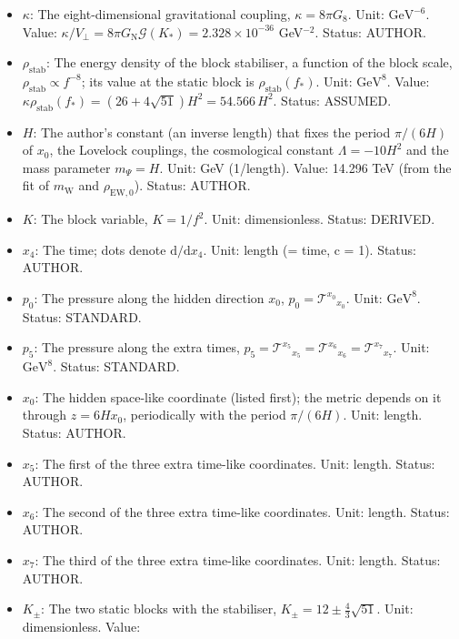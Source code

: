 \documentclass[
  10pt,
]{article}
\providecommand{\tightlist}{%
  \setlength{\itemsep}{0pt}\setlength{\parskip}{0pt}}
\begin{document}
\begin{itemize}
\tightlist
\item
  \(\kappa\): The eight-dimensional gravitational coupling,
  \(\kappa = 8\pi G_8\). Unit: \(\mathrm{GeV}^{-6}\). Value:
  \(\kappa/V_\perp = 8\pi G_{\mathrm{N}}\mathcal{G}(K_*) = 2.328\times10^{-36}\)
  GeV\(^{-2}\). Status: AUTHOR.
\item
  \(\rho_{\mathrm{stab}}\): The energy density of the block stabiliser,
  a function of the block scale,
  \(\rho_{\mathrm{stab}} \propto f^{-8}\); its value at the static block
  is \(\rho_{\mathrm{stab}}(f_*)\). Unit: \(\mathrm{GeV}^{8}\). Value:
  \(\kappa\rho_{\mathrm{stab}}(f_*) = (26 + 4\sqrt{51})H^2 = 54.566\,H^2\).
  Status: ASSUMED.
\item
  \(H\): The author's constant (an inverse length) that fixes the period
  \(\pi/(6H)\) of \(x_0\), the Lovelock couplings, the cosmological
  constant \(\Lambda = -10H^2\) and the mass parameter \(m_\Psi = H\).
  Unit: GeV (1/length). Value: 14.296 TeV (from the fit of
  \(m_{\mathrm{W}}\) and \(\rho_{\mathrm{EW},0}\)). Status: AUTHOR.
\item
  \(K\): The block variable, \(K = 1/f^2\). Unit: dimensionless. Status:
  DERIVED.
\item
  \(x_4\): The time; dots denote \(\mathrm{d}/\mathrm{d}x_4\). Unit:
  length (= time, c = 1). Status: AUTHOR.
\item
  \(p_0\): The pressure along the hidden direction \(x_0\),
  \(p_0 = \mathcal{T}^{x_0}{}_{x_0}\). Unit: \(\mathrm{GeV}^{8}\).
  Status: STANDARD.
\item
  \(p_5\): The pressure along the extra times,
  \(p_5 = \mathcal{T}^{x_5}{}_{x_5} = \mathcal{T}^{x_6}{}_{x_6} = \mathcal{T}^{x_7}{}_{x_7}\).
  Unit: \(\mathrm{GeV}^{8}\). Status: STANDARD.
\item
  \(x_0\): The hidden space-like coordinate (listed first); the metric
  depends on it through \(z = 6Hx_0\), periodically with the period
  \(\pi/(6H)\). Unit: length. Status: AUTHOR.
\item
  \(x_5\): The first of the three extra time-like coordinates. Unit:
  length. Status: AUTHOR.
\item
  \(x_6\): The second of the three extra time-like coordinates. Unit:
  length. Status: AUTHOR.
\item
  \(x_7\): The third of the three extra time-like coordinates. Unit:
  length. Status: AUTHOR.
\item
  \(K_\pm\): The two static blocks with the stabiliser,
  \(K_\pm = 12 \pm \frac43\sqrt{51}\). Unit: dimensionless. Value:

\end{itemize}
\end{document}

